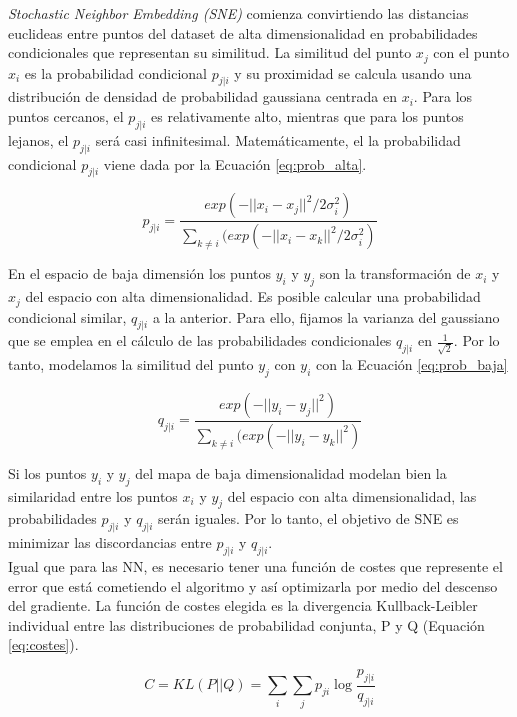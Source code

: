 \textit{Stochastic Neighbor Embedding (SNE)} comienza convirtiendo las distancias euclideas entre puntos del dataset de alta dimensionalidad en probabilidades condicionales que representan su similitud. La similitud del punto $x_j$ con el punto $x_i$ es la probabilidad condicional $p_{j|i}$ y su proximidad se calcula usando una distribución de densidad de probabilidad gaussiana centrada en $x_i$. Para los puntos cercanos, el $p_{j|i}$ es relativamente alto, mientras que para los puntos lejanos, el $p_{j|i}$ será casi infinitesimal. Matemáticamente, el la probabilidad condicional $p_{j|i}$ viene dada por la Ecuación \ref{eq:prob_alta}.

\begin{equation}
	p_{j|i} = \frac{exp(-||x_i-x_j||^2/2\sigma ^2_i)}{\sum_{k\neq i}( exp(-||x_i-x_k||^2/2\sigma ^2_i)}
	\label{eq:prob_alta}
\end{equation}
\vspace{4pt}

En el espacio de baja dimensión los puntos $y_i$ y $y_j$ son la transformación de $x_i$ y $x_j$ del espacio con alta dimensionalidad. Es posible calcular una probabilidad condicional similar, $q_{j|i}$ a la anterior. Para ello, fijamos la varianza del gaussiano que se emplea en el cálculo de las probabilidades condicionales $q_{j|i}$ en $\frac{1}{\sqrt{2}}$. Por lo tanto, modelamos la similitud del punto $y_j$ con $y_i$ con la Ecuación \ref{eq:prob_baja}

\begin{equation}
	q_{j|i} = \frac{exp(-||y_i-y_j||^2)}{\sum_{k\neq i}(exp(-||y_i-y_k||^2)}
	\label{eq:prob_baja}
\end{equation}
\vspace{4pt}

Si los puntos $y_i$ y $y_j$ del mapa de baja dimensionalidad modelan bien la similaridad entre los puntos $x_i$ y $y_j$ del espacio con alta dimensionalidad, las probabilidades $p_{j|i}$ y $q_{j|i}$ serán iguales. Por lo tanto, el objetivo de SNE es minimizar las discordancias entre $p_{j|i}$ y $q_{j|i}$.\\

Igual que para las NN, es necesario tener una función de costes que represente el error que está cometiendo el algoritmo y así optimizarla por medio del descenso del gradiente. La función de costes elegida es la divergencia Kullback-Leibler individual entre las distribuciones de probabilidad conjunta, P y Q (Equación \ref{eq:costes}).

\begin{equation}
	C = KL(P||Q) = \sum_{i}\sum_{j}p_{ji}\log\frac{p_{j|i}}{q_{j|i}}
	\label{eq:costes}
\end{equation}
\vspace{4pt}

